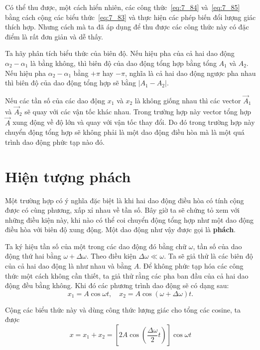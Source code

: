 Có thể thu được, một cách hiển nhiên, các công thức~\eqref{eq:7_84} và~\eqref{eq:7_85} bằng cách cộng các biểu thức~\eqref{eq:7_83} và thực hiện các phép biến đổi lượng giác thích hợp. Nhưng cách mà ta đã áp dụng để thu được các công thức này có đặc điểm là rất đơn giản và dễ thấy.

Ta hãy phân tích biểu thức  của biên độ. Nếu hiệu pha của cả hai dao động $\alpha_2-\alpha_1$ là bằng không, thì biên độ của dao động tổng hợp bằng tổng $A_1$ và $A_2$. Nếu hiệu pha $\alpha_2-\alpha_1$ bằng $+\pi$ hay $-\pi$, nghĩa là cả hai dao động ngược pha nhau thì biên độ của dao động tổng hợp sẽ bằng $|A_1-A_2|$.

Nếu các tần số của các dao động $x_1$ và $x_2$ là không giống nhau thì các vector $\vec{A}_1$ và $\vec{A}_2$ sẽ quay với các vận tốc khác nhau. Trong trường hợp này vector tổng hợp $\vec{A}$ xung động về độ lớn và quay với vận tốc thay đổi. Do đó trong trường hợp này chuyển động tổng hợp sẽ không phải là một dao động điều hòa mà là một quá trình dao động phức tạp nào đó.

\section{Hiện tượng phách}\label{sec:7_8}

Một trường hợp có ý nghĩa đặc biệt là khi hai dao động điều hòa có tính cộng được có cùng phương, xấp xỉ nhau về tần số. Bây giờ ta sẽ chứng tỏ xem với những điều kiện này, khi nào có thể coi chuyển động tổng hợp như một dao động điều hòa với biên độ xung động. Một dao động như vậy được gọi là \textbf{phách}.

Ta ký hiệu tần số của một trong các dao động đó bằng chữ $\omega$, tần số của dao động thứ hai bằng $\omega+\Delta\omega$. Theo điều kiện $\Delta\omega\ll\omega$. Ta sẽ giả thử là các biên độ của cả hai dao động là như nhau và bằng $A$. Để không phức tạp hóa các công thức một cách không cần thiết, ta giả thử rằng các pha ban đầu của cả hai dao động đều bằng không. Khi đó các phương trình dao động sẽ có dạng sau:
\begin{equation*}
	x_1 = A\cos\omega t,\quad x_2 = A\cos(\omega+\Delta\omega) t.
\end{equation*}

\noindent
Cộng các biểu thức này và dùng công thức lượng giác cho tổng các cosine, ta được
\begin{equation}\label{eq:7_86}
	x = x_1 + x_2 = \left[ 2A \cos\left(\frac{\Delta\omega}{2}t\right)\right] \cos\omega t
\end{equation}

